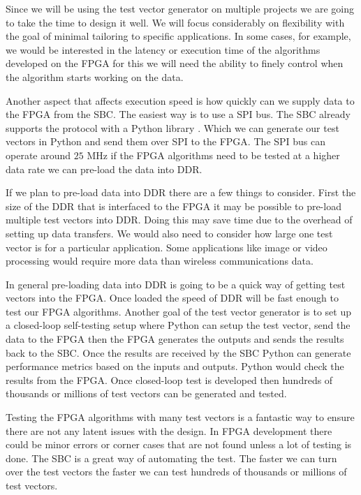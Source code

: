 Since we will be using the test vector generator on multiple projects we are going to take the time to design it well. We will focus considerably on flexibility with the goal of minimal tailoring to specific applications. In some cases, for example, we would be interested in the latency or execution time of the algorithms developed on the \ac{FPGA} for this we will need the ability to finely control when the algorithm starts working on the data. 

Another aspect that affects execution speed is how quickly can we supply data to the \ac{FPGA} from the \ac{SBC}. The easiest way is to use a \ac{SPI} bus. The \ac{SBC} already supports the protocol with a Python library \cite{pispidev}. Which we can generate our test vectors in Python and send them over \ac{SPI} to the \ac{FPGA}. The \ac{SPI} bus can operate around $25$ \ac{MHz} if the \ac{FPGA} algorithms need to be tested at a higher data rate we can pre-load the data into \ac{DDR}. 

If we plan to pre-load data into \ac{DDR} there are a few things to consider. First the size of the \ac{DDR} that is interfaced to the \ac{FPGA} it may be possible to pre-load multiple test vectors into \ac{DDR}. Doing this may save time due to the overhead of setting up data transfers. We would also need to consider how large one test vector is for a particular application. Some applications like image or video processing would require more data than wireless communications data.

In general pre-loading data into \ac{DDR} is going to be a quick way of getting test vectors into the \ac{FPGA}. Once loaded the speed of \ac{DDR} will be fast enough to test our \ac{FPGA} algorithms. Another goal of the test vector generator is to set up a closed-loop self-testing setup where Python can setup the test vector, send the data to the \ac{FPGA} then the \ac{FPGA} generates the outputs and sends the results back to the \ac{SBC}. Once the results are received by the \ac{SBC} Python can generate performance metrics based on the inputs and outputs. Python would check the results from the \ac{FPGA}. Once closed-loop test is developed then hundreds of thousands or millions of test vectors can be generated and tested.

Testing the \ac{FPGA} algorithms with many test vectors is a fantastic way to ensure there are not any latent issues with the design. In \ac{FPGA} development there could be minor errors or corner cases that are not found unless a lot of testing is done. The \ac{SBC} is a great way of automating the test. The faster we can turn over the test vectors the faster we can test hundreds of thousands or millions of test vectors. 

